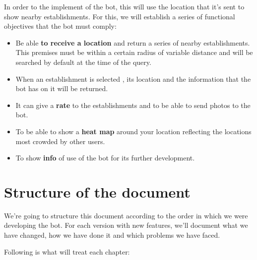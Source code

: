 \documentclass[oneside]{memoir}
\begin{document}
In order to the implement of the bot, this will use the location that it's sent to show nearby establishments. For this, we will establish a series of functional objectives that the bot must comply:

\begin{itemize}
  \item Be able \textbf{to receive a location} and return a series of nearby establishments. This premises must be within a certain radius of variable distance and will be searched by default at the time of the query.
  \item When an establishment is selected , its location and the information that the bot has on it will be returned.
  \item It can give a \textbf{rate} to the establishments and to be able to send photos to the bot.
  \item To be able to show a \textbf{heat map} around your location reflecting the locations most crowded by other users.
  \item To show \textbf{info} of use of the bot for its further development.
\end{itemize}


\section{Structure of the document}
We're going to structure this document according to the order in which we were developing the bot. For each version with new features, we'll document what we have changed, how we have done it and which problems we have faced.

Following is what will treat each chapter:
\end{document}
